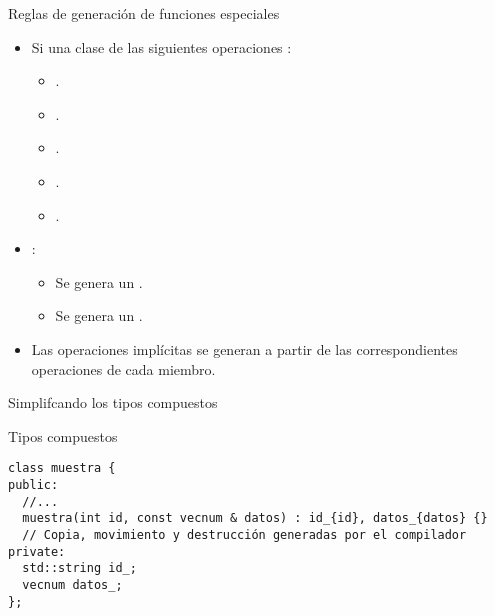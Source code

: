 \begin{frame}[t]{Reglas de generación de funciones especiales}
\begin{itemize}
  \item Si una clase  de las siguientes operaciones 
        :
    \begin{itemize}
      \item {}.
      \item {}.
      \item {}.
      \item {}.
      \item {}.
    \end{itemize}

  \item {}:
    \begin{itemize}
      \item Se genera un  .
      \item Se genera un  .
    \end{itemize}

  \item Las operaciones implícitas se generan a partir de las correspondientes operaciones
        de cada miembro.
\end{itemize}
\end{frame}

\begin{frame}[t,fragile]{Simplifcando los tipos compuestos}
\begin{block}{Tipos compuestos}
\begin{lstlisting}
class muestra {
public:
  //...
  muestra(int id, const vecnum & datos) : id_{id}, datos_{datos} {}
  // Copia, movimiento y destrucción generadas por el compilador
private:
  std::string id_;
  vecnum datos_;
};
\end{lstlisting}
\end{block}
\end{frame}

